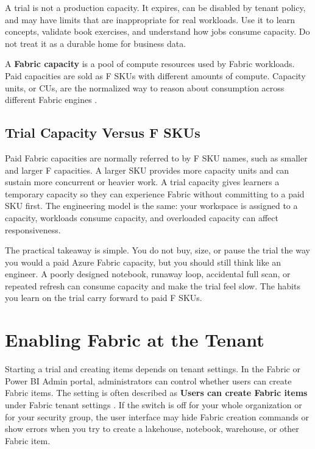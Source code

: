 A trial is not a production capacity. It expires, can be disabled by tenant policy, and may have limits that are inappropriate for real workloads. Use it to learn concepts, validate book exercises, and understand how jobs consume capacity. Do not treat it as a durable home for business data.

\begin{definitionbox}
A \textbf{Fabric capacity} is a pool of compute resources used by Fabric workloads. Paid capacities are sold as F SKUs with different amounts of compute. Capacity units, or CUs, are the normalized way to reason about consumption across different Fabric engines \cite{microsoftFabricCapacity}.
\end{definitionbox}

\subsection{Trial Capacity Versus F SKUs}
Paid Fabric capacities are normally referred to by F SKU names, such as smaller and larger F capacities. A larger SKU provides more capacity units and can sustain more concurrent or heavier work. A trial capacity gives learners a temporary capacity so they can experience Fabric without committing to a paid SKU first. The engineering model is the same: your workspace is assigned to a capacity, workloads consume capacity, and overloaded capacity can affect responsiveness.

The practical takeaway is simple. You do not buy, size, or pause the trial the way you would a paid Azure Fabric capacity, but you should still think like an engineer. A poorly designed notebook, runaway loop, accidental full scan, or repeated refresh can consume capacity and make the trial feel slow. The habits you learn on the trial carry forward to paid F SKUs.

\section{Enabling Fabric at the Tenant}
Starting a trial and creating items depends on tenant settings. In the Fabric or Power BI Admin portal, administrators can control whether users can create Fabric items. The setting is often described as \textbf{Users can create Fabric items} under Fabric tenant settings \cite{microsoftFabricTenantSettings}. If the switch is off for your whole organization or for your security group, the user interface may hide Fabric creation commands or show errors when you try to create a lakehouse, notebook, warehouse, or other Fabric item.

